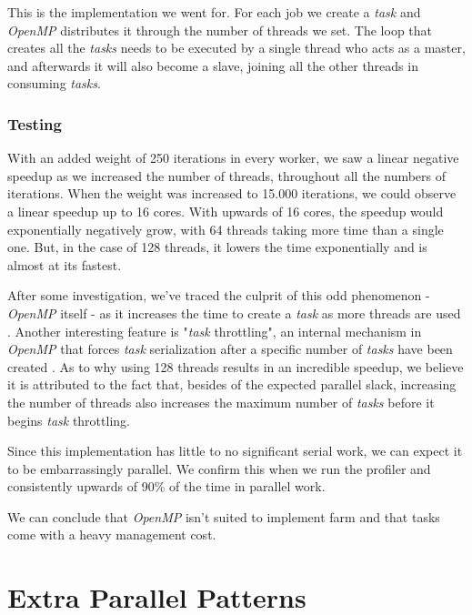 \documentclass[9pt,journal]{IEEEtran}
\begin{document}
This is the implementation we went for. For each job we create a \textit{task} and \textit{OpenMP} distributes it through the number of threads we set. The loop that creates all the \textit{tasks} needs to be executed by a single thread who acts as a master, and afterwards it will also become a slave, joining all the other threads in consuming \textit{tasks}.

\subsubsection{Testing}

With an added weight of 250 iterations in every worker, we saw a linear negative speedup as we increased the number of threads, throughout all the numbers of iterations. When the weight was increased to 15.000 iterations, we could observe a linear speedup up to 16 cores. With upwards of 16 cores, the speedup would exponentially negatively grow, with 64 threads taking more time than a single one. But, in the case of 128 threads, it lowers the time exponentially and is almost at its fastest.

After some investigation, we've traced the culprit of this odd phenomenon - \textit{OpenMP} itself - as it increases the time to create a \textit{task} as more threads are used \cite{granularity}. Another interesting feature is "\textit{task} throttling", an internal mechanism in \textit{OpenMP} that forces \textit{task} serialization after a specific number of \textit{tasks} have been created \cite{granularity}. As to why using 128 threads results in an incredible speedup, we believe it is attributed to the fact that, besides of the expected parallel slack, increasing the number of threads also increases the maximum number of \textit{tasks} before it begins \textit{task} throttling.

Since this implementation has little to no significant serial work, we can expect it to be embarrassingly parallel. We confirm this when we run the profiler and consistently upwards of 90\% of the time in parallel work.

We can conclude that \textit{OpenMP} isn't suited to implement farm and that tasks come with a heavy management cost. 

\section{Extra Parallel Patterns}

\end{document}
